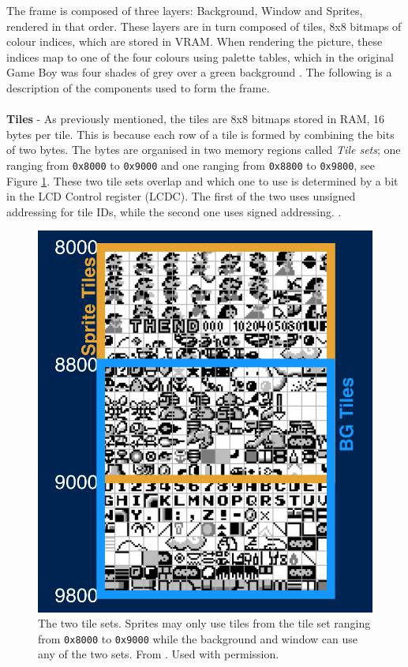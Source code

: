 The frame is composed of three layers: Background, Window and Sprites, rendered in that order. These layers are in turn composed of tiles, 8x8 bitmaps of colour indices, which are stored in VRAM. When rendering the picture, these indices map to one of the four colours using palette tables, which in the original Game Boy was four shades of grey over a green background \cite{gameboyarchitecture}. The following is a description of the components used to form the frame.\\
\\
\textbf{Tiles} - 
As previously mentioned, the tiles are 8x8 bitmaps stored in RAM, 16 bytes per tile. This is because each row of a tile is formed by combining the bits of two bytes. The bytes are organised in two memory regions called \textit{Tile sets}; one ranging from \texttt{0x8000} to \texttt{0x9000} and one ranging from \texttt{0x8800} to \texttt{0x9800}, see Figure \ref{fig:ppu_tile_set}. These two tile sets overlap and which one to use is determined by a bit in the LCD Control register (LCDC). The first of the two uses unsigned addressing for tile IDs, while the second one uses signed addressing. \cite{gameboyarchitecture}.
\newpage
\begin{figure}[H]
    \centering
    \includegraphics[width=0.8\linewidth]{figures/PPU/PPU_tile_sets_divided.png}
    \caption{The two tile sets. Sprites may only use tiles from the tile set ranging from \texttt{0x8000} to \texttt{0x9000} while the background and window can use any of the two sets. From \cite{ultimateGBtalkSlides}. Used with permission.}
    \label{fig:ppu_tile_set}
\end{figure}
